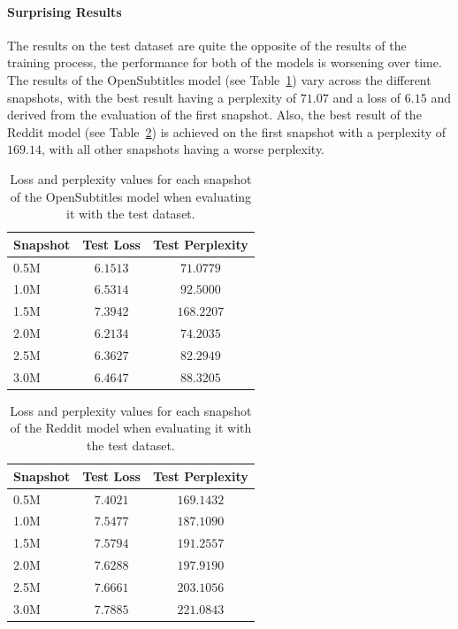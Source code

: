 \paragraph{Surprising Results} The results on the test dataset are quite the opposite of the results of the training process, the performance for both of the models is
worsening over time. The results of the OpenSubtitles model (see Table~\ref{results:test_metrics:opensubtitles}) vary across the different snapshots, with the best result having a perplexity of $71.07$ and a loss of $6.15$ and derived from the evaluation of the first snapshot. Also, the best result of the Reddit model (see Table~\ref{results:test_metrics:reddit}) is achieved on the first snapshot with a perplexity of $169.14$, with all other snapshots having a worse perplexity.
\\
\begin{table}[H]
	\centering
	\begin{adjustbox}{max width=\textwidth}
		\begin{tabular}{l|cc}
			\toprule
			Snapshot & Test Loss & Test Perplexity\\
			\midrule
			0.5M & $6.1513$ & $71.0779$\\
			1.0M & $6.5314$ & $92.5000$\\
			1.5M & $7.3942$ & $168.2207$\\
			2.0M & $6.2134$ & $74.2035$\\
			2.5M & $6.3627$ & $82.2949$\\
			3.0M & $6.4647$ & $88.3205$\\
			\bottomrule
		\end{tabular}
	\end{adjustbox}
	\caption{Loss and perplexity values for each snapshot of the OpenSubtitles model when evaluating it with the test dataset.}
	\label{results:test_metrics:opensubtitles}
\end{table}

\begin{table}[H]
	\centering
	\begin{adjustbox}{max width=\textwidth}
		\begin{tabular}{l|cc}
			\toprule
			Snapshot & Test Loss & Test Perplexity\\
			\midrule
			0.5M & $7.4021$ & $169.1432$\\
			1.0M & $7.5477$ & $187.1090$\\
			1.5M & $7.5794$ & $191.2557$\\
			2.0M & $7.6288$ & $197.9190$\\
			2.5M & $7.6661$ & $203.1056$\\
			3.0M & $7.7885$ & $221.0843$\\
			\bottomrule
		\end{tabular}
	\end{adjustbox}
	\caption{Loss and perplexity values for each snapshot of the Reddit model when evaluating it with the test dataset.}
	\label{results:test_metrics:reddit}
\end{table}

